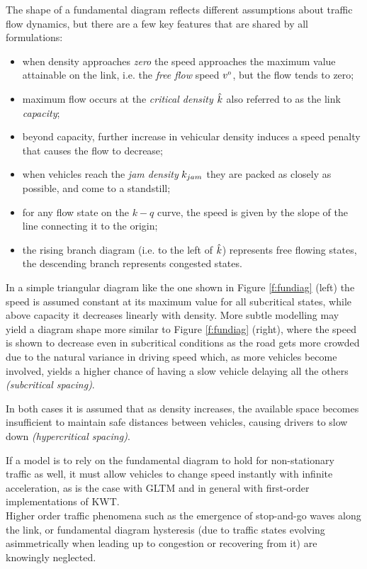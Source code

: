 The shape of a fundamental diagram reflects different assumptions about traffic flow dynamics, but there are a few key features that are shared by all formulations:
\begin{itemize}
\item when density approaches \emph{zero} the speed approaches the maximum value attainable on the link, i.e. the \emph{free flow} speed $v^{\scriptscriptstyle{0}}$, but the flow tends to zero;
\item maximum flow occurs at the \emph{critical density $\hat{k}$} also referred to as the link \emph{capacity};
\item beyond capacity, further increase in vehicular density induces a speed penalty that causes the flow to decrease;
\item when vehicles reach the \emph{jam density} $k_{jam}$ they are packed as closely as possible, and come to a standstill;
\item for any flow state on the $k-q$ curve, the speed is given by the slope of the line connecting it to the origin;
\item the rising branch diagram (i.e. to the left of $\hat{k}$) represents free flowing 
states, the descending branch represents congested states.
\end{itemize}

In a simple triangular diagram like the one shown in Figure \ref{f:fundiag} (left) the speed is assumed constant at its maximum value for all subcritical states, while above capacity it decreases linearly with density. More subtle modelling may yield a diagram shape more similar to Figure \ref{f:fundiag} (right), where the speed is shown to decrease even in subcritical conditions as the road gets more crowded due to the natural variance in driving speed which, as more vehicles become involved, yields a higher chance of having a slow vehicle delaying all the others \emph{(subcritical spacing)}.

 In both cases it is assumed that as density increases, the available space becomes insufficient to maintain safe distances between vehicles, causing drivers to slow down \emph{(hypercritical spacing)}.

If a model is to rely on the fundamental diagram to hold for non-stationary traffic as well, it must allow vehicles to change speed instantly with infinite acceleration, as is the case with GLTM and in general with first-order implementations of KWT. \\
Higher order traffic phenomena such as the emergence of stop-and-go waves along the link, or fundamental diagram hysteresis (due to traffic states evolving asimmetrically when leading up to congestion or recovering from it) are knowingly neglected.

